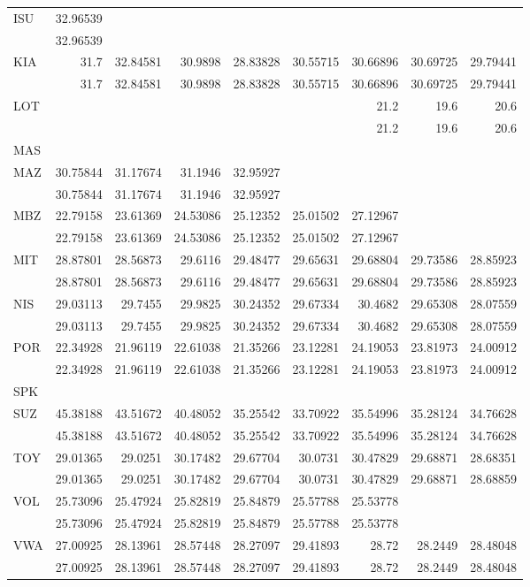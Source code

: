 \begin{tabular}{lrrrrrrrr}
ISU & 32.96539 &  &  &  &  &  &  &  \\
 & 32.96539 &  &  &  &  &  &  &  \\
KIA & 31.7 & 32.84581 & 30.9898 & 28.83828 & 30.55715 & 30.66896 & 30.69725 & 29.79441 \\
 & 31.7 & 32.84581 & 30.9898 & 28.83828 & 30.55715 & 30.66896 & 30.69725 & 29.79441 \\
LOT &  &  &  &  &  & 21.2 & 19.6 & 20.6 \\
 &  &  &  &  &  & 21.2 & 19.6 & 20.6 \\
MAS &  &  &  &  &  &  &  &  \\
MAZ & 30.75844 & 31.17674 & 31.1946 & 32.95927 &  &  &  &  \\
 & 30.75844 & 31.17674 & 31.1946 & 32.95927 &  &  &  &  \\
MBZ & 22.79158 & 23.61369 & 24.53086 & 25.12352 & 25.01502 & 27.12967 &  &  \\
 & 22.79158 & 23.61369 & 24.53086 & 25.12352 & 25.01502 & 27.12967 &  &  \\
MIT & 28.87801 & 28.56873 & 29.6116 & 29.48477 & 29.65631 & 29.68804 & 29.73586 & 28.85923 \\
 & 28.87801 & 28.56873 & 29.6116 & 29.48477 & 29.65631 & 29.68804 & 29.73586 & 28.85923 \\
NIS & 29.03113 & 29.7455 & 29.9825 & 30.24352 & 29.67334 & 30.4682 & 29.65308 & 28.07559 \\
 & 29.03113 & 29.7455 & 29.9825 & 30.24352 & 29.67334 & 30.4682 & 29.65308 & 28.07559 \\
POR & 22.34928 & 21.96119 & 22.61038 & 21.35266 & 23.12281 & 24.19053 & 23.81973 & 24.00912 \\
 & 22.34928 & 21.96119 & 22.61038 & 21.35266 & 23.12281 & 24.19053 & 23.81973 & 24.00912 \\
SPK &  &  &  &  &  &  &  &  \\
SUZ & 45.38188 & 43.51672 & 40.48052 & 35.25542 & 33.70922 & 35.54996 & 35.28124 & 34.76628 \\
 & 45.38188 & 43.51672 & 40.48052 & 35.25542 & 33.70922 & 35.54996 & 35.28124 & 34.76628 \\
TOY & 29.01365 & 29.0251 & 30.17482 & 29.67704 & 30.0731 & 30.47829 & 29.68871 & 28.68351 \\
 & 29.01365 & 29.0251 & 30.17482 & 29.67704 & 30.0731 & 30.47829 & 29.68871 & 28.68859 \\
VOL & 25.73096 & 25.47924 & 25.82819 & 25.84879 & 25.57788 & 25.53778 &  &  \\
 & 25.73096 & 25.47924 & 25.82819 & 25.84879 & 25.57788 & 25.53778 &  &  \\
VWA & 27.00925 & 28.13961 & 28.57448 & 28.27097 & 29.41893 & 28.72 & 28.2449 & 28.48048 \\
 & 27.00925 & 28.13961 & 28.57448 & 28.27097 & 29.41893 & 28.72 & 28.2449 & 28.48048 \\
\bottomrule
\end{tabular}

